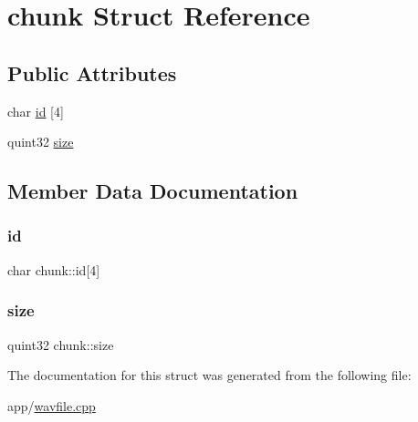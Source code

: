 \hypertarget{structchunk}{}\section{chunk Struct Reference}
\label{structchunk}
\subsection*{Public Attributes}
\begin{DoxyCompactItemize}
\item 
char \hyperlink{structchunk_abbdb8d8e521edcb7483320c66526d34e}{id} \mbox{[}4\mbox{]}
\item 
quint32 \hyperlink{structchunk_a93de60bdeb204f9b7572c346584ce680}{size}
\end{DoxyCompactItemize}


\subsection{Member Data Documentation}
\hypertarget{structchunk_abbdb8d8e521edcb7483320c66526d34e}{}\label{structchunk_abbdb8d8e521edcb7483320c66526d34e} 
\subsubsection{\texorpdfstring{id}{id}}
{\footnotesize\ttfamily char chunk\+::id\mbox{[}4\mbox{]}}

\hypertarget{structchunk_a93de60bdeb204f9b7572c346584ce680}{}\label{structchunk_a93de60bdeb204f9b7572c346584ce680} 
\subsubsection{\texorpdfstring{size}{size}}
{\footnotesize\ttfamily quint32 chunk\+::size}



The documentation for this struct was generated from the following file\+:\begin{DoxyCompactItemize}
\item 
app/\hyperlink{wavfile_8cpp}{wavfile.\+cpp}\end{DoxyCompactItemize}
